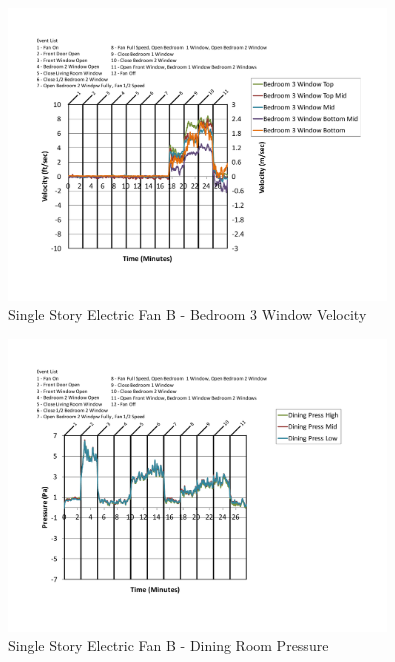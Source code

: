 \documentclass{article}
\begin{document}
\begin{appendices}
	\begin{figure}[H]
		\centering
		\includegraphics[height=3.05in,trim=0.67in 1.1in 0.67in 0.8in,clip=true]{0_Images/Results_Charts/ColdFlow/Single_Story/Electric/B/Bedroom_3_Window_Velocity.pdf}
		\caption{Single Story Electric Fan B - Bedroom 3 Window Velocity}
	\end{figure}
 

	\begin{figure}[H]
		\centering
		\includegraphics[height=3.05in,trim=0.67in 1.1in 0.67in 0.8in,clip=true]{0_Images/Results_Charts/ColdFlow/Single_Story/Electric/B/Dining_Room_Pressure.pdf}
		\caption{Single Story Electric Fan B - Dining Room Pressure}
	\end{figure}
 
	\clearpage


\end{appendices}
\end{document}
